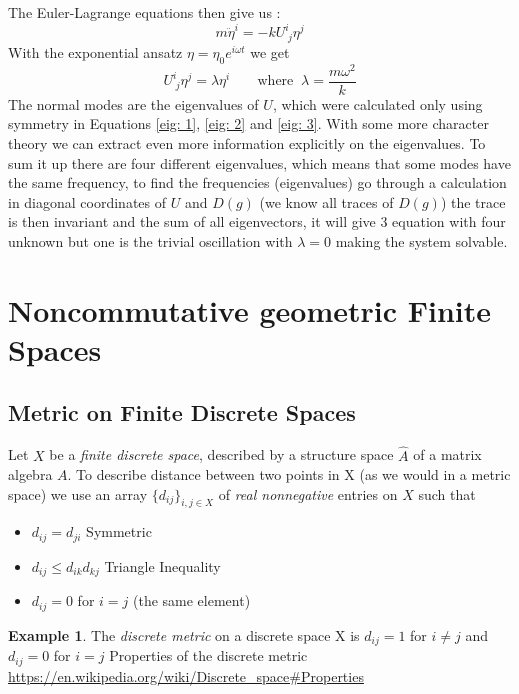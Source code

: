 \documentclass[a4paper]{article}
\theoremstyle{definition}
\theoremstyle{definition}
\theoremstyle{definition}
\newtheorem{example}{Example}
\theoremstyle{theorem}
\theoremstyle{theorem}
\theoremstyle{definition}
\begin{document}
The Euler-Lagrange equations then give us :
\begin{equation}
    m\ddot{\eta}^i = -k U^i_{\; j} \eta ^j
\end{equation}
With the exponential ansatz $\eta = \eta _0 e^{i\omega t}$ we get
\begin{equation}
    U^i_{\; j}\eta ^j = \lambda \eta ^i \;\;\;\;\;\;\; \text{where} \;\; \lambda = \frac{m\omega^2}{k}
\end{equation}
The normal modes are the eigenvalues of $U$, which were calculated only using symmetry in Equations
\ref{eig: 1}, \ref{eig: 2} and \ref{eig: 3}. With some more character theory we can extract even more
information explicitly on the eigenvalues. To sum it up there are four different eigenvalues, which means
that some modes have the same frequency, to find the frequencies (eigenvalues) go through a calculation in
diagonal coordinates of $U$ and $D(g)$ (we know all traces of $D(g)$) the trace is then invariant and the
sum of all eigenvectors, it will give 3 equation with four unknown but one is the trivial oscillation
with $\lambda = 0$ making the system solvable.

\section{Noncommutative geometric Finite Spaces}
\subsection{Metric on Finite Discrete Spaces}
Let $X$ be a \textit{finite discrete space}, described by a structure space $\hat{A}$ of
a matrix algebra $A$. To describe distance between two points in X (as we would in a metric space)
we use an array $\{d_{ij}\}_{i, j \in X}$ of \textit{real nonnegative} entries on $X$
such that
\begin{itemize}
    \item $d_{ij} = d_{ji}$             Symmetric
    \item $d_{ij} \leq d_{ik} d_{kj}$       Triangle Inequality
    \item $d_{ij} = 0$ for $i=j$ (the same element)
\end{itemize}

\begin{example}
    The \textit{discrete metric} on a discrete space X is $d_{ij}=1$ for $i\neq j$ and $d_{ij}=0$
    for $i = j$
    \newline
    Properties of the discrete metric \url{https://en.wikipedia.org/wiki/Discrete_space#Properties}
\end{example}
\end{document}

